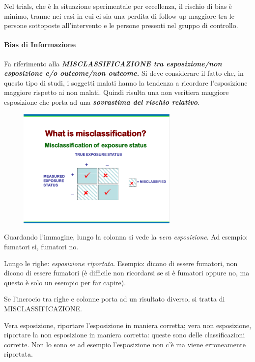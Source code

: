 Nel trials, che è la situazione sperimentale per eccellenza, il rischio
di bias è minimo, tranne nei casi in cui ci sia una perdita di follow up
maggiore tra le persone sottoposte all'intervento e le persone presenti
nel gruppo di controllo.

\paragraph{Bias di Informazione}

Fa riferimento alla \textbf{\emph{MISCLASSIFICAZIONE tra esposizione/non
esposizione e/o outcome/non outcome.}} Si deve considerare il fatto che,
in questo tipo di studi, i soggetti malati hanno la tendenza a ricordare
l'esposizione maggiore rispetto ai non malati. Quindi risulta una non
veritiera maggiore esposizione che porta ad una \textbf{\emph{sovrastima
del rischio relativo}}.

\begin{figure}[!ht]
\centering
\includegraphics[width=0.7\textwidth]{05/image7.png}
\end{figure}

Guardando l'immagine, lungo la colonna si vede la \emph{vera
esposizione}. Ad esempio: fumatori sì, fumatori no.

Lungo le righe: \emph{esposizione riportata}. Esempio: dicono di essere
fumatori, non dicono di essere fumatori (è difficile non ricordarsi se
si è fumatori oppure no, ma questo è solo un esempio per far capire).

Se l'incrocio tra righe e colonne porta ad un risultato diverso, si
tratta di MISCLASSIFICAZIONE.

Vera esposizione, riportare l'esposizione in maniera corretta; vera non
esposizione, riportare la non esposizione in maniera corretta: queste
sono delle classificazioni corrette. Non lo sono se ad esempio
l'esposizione non c'è ma viene erroneamente riportata.


